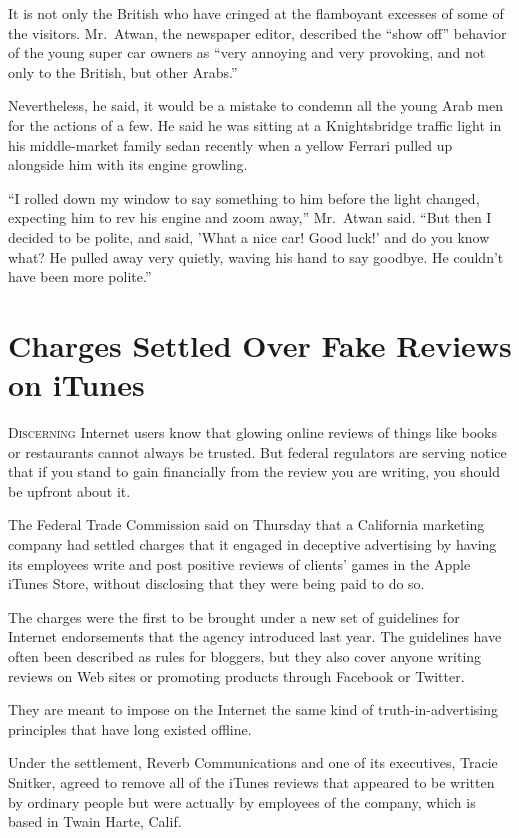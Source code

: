 ﻿\documentclass[12pt]{article}
\begin{document}
It is not only the British who have cringed at the flamboyant excesses of some of the visitors.
Mr.~Atwan, the newspaper editor, described the ``show off'' behavior of the young super car owners
as ``very annoying and very provoking, and not only to the British, but other Arabs.''

Nevertheless, he said, it would be a mistake to condemn all the young Arab men for the actions of a
few. He said he was sitting at a Knightsbridge traffic light in his middle-market family sedan
recently when a yellow Ferrari pulled up alongside him with its engine growling.

``I rolled down my window to say something to him before the light changed, expecting him to rev his
engine and zoom away,'' Mr.~Atwan said. ``But then I decided to be polite, and said, 'What a nice
car! Good luck!' and do you know what? He pulled away very quietly, waving his hand to say goodbye.
He couldn't have been more polite.''

\pagebreak
\section{Charges Settled Over Fake Reviews on iTunes}

\lettrine{D}{iscerning} Internet users know that glowing online reviews of
things like books or restaurants cannot always be trusted. But federal regulators are serving notice
that if you stand to gain financially from the review you are writing, you should be upfront about
it.

The Federal Trade Commission said on Thursday that a California marketing company had settled
charges that it engaged in deceptive advertising by having its employees write and post positive
reviews of clients' games in the Apple iTunes Store, without disclosing that they were being paid to
do so.

The charges were the first to be brought under a new set of guidelines for Internet endorsements
that the agency introduced last year. The guidelines have often been described as rules for
bloggers, but they also cover anyone writing reviews on Web sites or promoting products through
Facebook or Twitter.

They are meant to impose on the Internet the same kind of truth-in-advertising principles that have
long existed offline.

Under the settlement, Reverb Communications and one of its executives, Tracie Snitker, agreed to
remove all of the iTunes reviews that appeared to be written by ordinary people but were actually by
employees of the company, which is based in Twain Harte, Calif.
\end{document}
